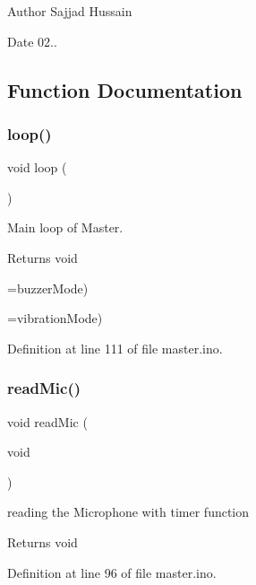 \begin{DoxyAuthor}{Author}
Sajjad Hussain
\end{DoxyAuthor}
\begin{DoxyDate}{Date}
02.. 
\end{DoxyDate}


\subsection{Function Documentation}
\mbox{\label{master_8ino_afe461d27b9c48d5921c00d521181f12f}} 
\subsubsection{\texorpdfstring{loop()}{loop()}}
{\footnotesize\ttfamily void loop (\begin{DoxyParamCaption}{ }\end{DoxyParamCaption})}



Main loop of Master. 

\begin{DoxyReturn}{Returns}
void 
\end{DoxyReturn}
=buzzer\+Mode)

=vibration\+Mode) 

Definition at line 111 of file master.\+ino.

\mbox{\label{master_8ino_acb567cd7c0b4da511205a0194cb9da81}} 
\subsubsection{\texorpdfstring{readMic()}{readMic()}}
{\footnotesize\ttfamily void read\+Mic (\begin{DoxyParamCaption}\item[{void}]{ }\end{DoxyParamCaption})}



reading the Microphone with timer function 

\begin{DoxyReturn}{Returns}
void 
\end{DoxyReturn}


Definition at line 96 of file master.\+ino.

